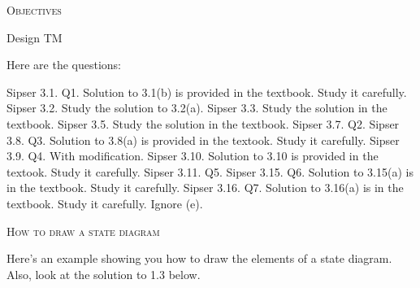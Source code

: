 

\renewcommand\AUTHOR{John Doe}


\topmatter

\textsc{Objectives}
\begin{itemize}
\li Design TM
\end{itemize}

Here are the questions:
\begin{myenum}
\li Sipser 3.1. Q1. Solution to 3.1(b) is provided in the textbook. Study it carefully. 
\li Sipser 3.2. Study the solution to 3.2(a).
\li Sipser 3.3. Study the solution in the textbook.
\li Sipser 3.5. Study the solution in the textbook.
\li Sipser 3.7. Q2.
\li Sipser 3.8. Q3. Solution to 3.8(a) is provided in the textook. Study it carefully.
\li Sipser 3.9. Q4. With modification. 
\li Sipser 3.10. Solution to 3.10 is provided in the textook. Study it carefully. 
\li Sipser 3.11. Q5. 
\li Sipser 3.15. Q6. Solution to 3.15(a) is in the textbook. Study it carefully.
\li Sipser 3.16. Q7. Solution to 3.16(a) is in the textbook. Study it carefully.
Ignore (e).
\end{myenum}


\newpage
\textsc{How to draw a state diagram}

Here's an example showing you how to draw the elements of a state diagram.
Also, look at the solution to 1.3 below.

\begin{center}
\end{center}

